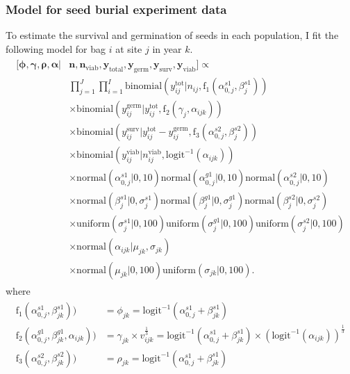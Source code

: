 \documentclass[12pt, oneside, titlepage]{article}   	%
\begin{document}
\subsubsection*{Model for seed burial experiment data}

To estimate the survival and germination of seeds in each population, I fit the following model for bag $i$ at site $j$ in year $k$. 
%
\begin{align}
  \begin{split}
 [ \bm{\phi}, \bm{\gamma}, \bm{\rho}, \bm{\alpha} | & \bm{n}, \bm{n_{\mathrm{viab}}}, \bm{y_{\mathrm{total}}},  \bm{y_{\mathrm{germ}}},  \bm{y_{\mathrm{surv}}}, \bm{y_{\mathrm{viab}}} ] \propto \\
   & \prod_{j=1}^{J} \prod_{i=1}^{I} %
   \mathrm{binomial} ( y^{\mathrm{tot}}_{ij} | n_{ij}, \mathrm{f}_1(\alpha^{s1}_{0,j} , \beta^{s1}_{j} ) ) 
 \\ & \times \mathrm{binomial} ( y^{\mathrm{germ}}_{ij}  | y^{\mathrm{tot}}_{ij}  , \mathrm{f}_2( \gamma_{j} , \alpha_{ijk}) )
 \\ & \times \mathrm{binomial} ( y^{\mathrm{surv}}_{ij} | y^{\mathrm{tot}}_{ij}  -  y^{\mathrm{germ}}_{ij}   , \mathrm{f}_3(\alpha^{s2}_{0,j} , \beta^{s2}_{j} ) ) 
 \\ & \times  \mathrm{binomial} ( y^{\mathrm{viab}}_{ij} | n^{\mathrm{viab}}_{ij}, \mathrm{logit}^{-1}(\alpha_{ijk}) ) 
    \\ & \times \mathrm{normal} ( \alpha^{s1}_{0,j} | 0, 10) \mathrm{normal} ( \alpha^{g1}_{0,j} | 0, 10) \mathrm{normal} ( \alpha^{s2}_{0,j} | 0, 10)  
    \\ & \times \mathrm{normal} ( \beta^{s1}_{j} | 0, \sigma_j^{s1}) \mathrm{normal} ( \beta^{g1}_{j} | 0, \sigma_j^{g1}) \mathrm{normal} ( \beta^{s2}_{j} | 0, \sigma_j^{s2}) 
    \\ & \times \mathrm{uniform} ( \sigma_j^{s1} | 0, 100) \mathrm{uniform} ( \sigma_j^{g1} | 0, 100)  \mathrm{uniform} ( \sigma_j^{s2} | 0, 100)   
  \\ & \times \mathrm{normal} ( \alpha_{ijk}  | \mu_{jk}, \sigma_{jk} )
  \\ & \times \mathrm{normal} ( \mu_{jk} | 0 , 100 ) \mathrm{uniform} ( \sigma_{jk} | 0,100).
  \end{split}
\end{align}
%
where
%
\begin{align}
  \begin{split}
\mathrm{f}_1(\alpha^{s1}_{0,j} , \beta^{s1}_{jk} ) ) & =  \phi_{jk} = \mathrm{logit}^{-1}(\alpha^{s1}_{0,j} + \beta^{s1}_{jk}) \\
\mathrm{f}_2(\alpha^{g1}_{0,j} , \beta^{g1}_{jk},  \alpha_{ijk} ) ) & = \gamma_{jk} \times v_{ijk}^\frac{1}{3} = \mathrm{logit}^{-1}(\alpha^{s1}_{0,j} + \beta^{s1}_{jk}) \times ( \mathrm{logit}^{-1}(\alpha_{ijk}))^\frac{1}{3} \\
\mathrm{f}_3(\alpha^{s2}_{0,j} , \beta^{s2}_{jk} ) ) & =  \rho_{jk} = \mathrm{logit}^{-1}(\alpha^{s1}_{0,j} + \beta^{s1}_{jk})
  \end{split}
\end{align}
\end{document}
